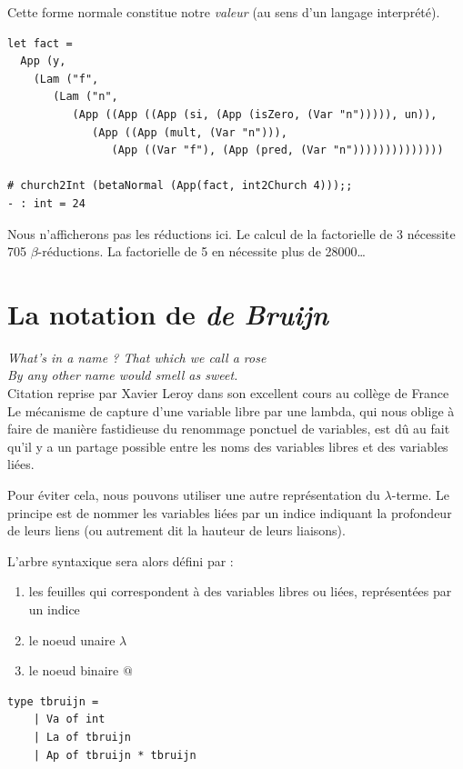 \documentclass[11pt]{book}
\begin{document}
Cette forme normale constitue notre \textit{valeur} (au sens d'un langage interprété).
\begin{Verbatim}
let fact =
  App (y,
    (Lam ("f",
       (Lam ("n",
          (App ((App ((App (si, (App (isZero, (Var "n"))))), un)),
             (App ((App (mult, (Var "n"))),
                (App ((Var "f"), (App (pred, (Var "n"))))))))))))))

# church2Int (betaNormal (App(fact, int2Church 4)));;
- : int = 24																																							 
\end{Verbatim}
Nous n'afficherons pas les réductions ici. Le calcul de la factorielle de 3 nécessite 705 $\beta$-réductions. 
La factorielle de 5 en nécessite plus de 28000\ldots

\section{La notation de \textit{de Bruijn}}
\noindent
\textit{What's in a name ? That which we call a rose \\
	   By any other name would smell as sweet.}\cite{WS} \\
	   Citation reprise par Xavier Leroy dans
	   son excellent cours au collège de France \\

\vspace{0.4cm}
Le mécanisme de capture d'une variable libre par une lambda, qui nous oblige à faire de manière fastidieuse
du renommage ponctuel de variables, est dû au fait qu'il y a un partage possible entre les noms des variables
libres et des variables liées. 

Pour éviter cela, nous pouvons utiliser une autre représentation du $\lambda$-terme. Le principe est
de nommer les variables liées par un indice indiquant la profondeur de leurs liens (ou autrement dit la
hauteur de leurs liaisons).

L'arbre syntaxique sera alors défini par :
\begin{enumerate}
	\item les feuilles qui correspondent à des variables libres ou liées, représentées par un indice
	\item le noeud unaire $\lambda$
	\item le noeud binaire $@$
\end{enumerate}

\begin{Verbatim}
type tbruijn =
	| Va of int
	| La of tbruijn 
	| Ap of tbruijn * tbruijn
\end{Verbatim}
	
\end{document}
